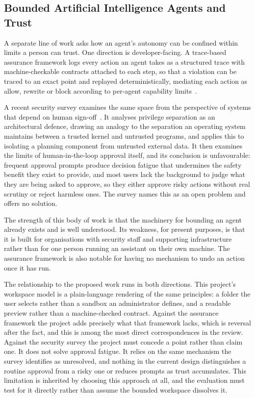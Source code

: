 \documentclass{FastFyp}
\begin{document}
\subsection{Bounded Artificial Intelligence Agents and Trust}
A separate line of work asks how an agent's autonomy can be confined within limits a person can trust. One direction is developer-facing. A trace-based assurance framework logs every action an agent takes as a structured trace with machine-checkable contracts attached to each step, so that a violation can be traced to an exact point and replayed deterministically, mediating each action as allow, rewrite or block according to per-agent capability limits~\cite{ref:paduraru2026}.

A recent security survey examines the same space from the perspective of systems that depend on human sign-off~\cite{ref:kim2026}. It analyses privilege separation as an architectural defence, drawing an analogy to the separation an operating system maintains between a trusted kernel and untrusted programs, and applies this to isolating a planning component from untrusted external data. It then examines the limits of human-in-the-loop approval itself, and its conclusion is unfavourable: frequent approval prompts produce decision fatigue that undermines the safety benefit they exist to provide, and most users lack the background to judge what they are being asked to approve, so they either approve risky actions without real scrutiny or reject harmless ones. The survey names this as an open problem and offers no solution.

The strength of this body of work is that the machinery for bounding an agent already exists and is well understood. Its weakness, for present purposes, is that it is built for organisations with security staff and supporting infrastructure rather than for one person running an assistant on their own machine. The assurance framework is also notable for having no mechanism to undo an action once it has run.

The relationship to the proposed work runs in both directions. This project's workspace model is a plain-language rendering of the same principles: a folder the user selects rather than a sandbox an administrator defines, and a readable preview rather than a machine-checked contract. Against the assurance framework the project adds precisely what that framework lacks, which is reversal after the fact, and this is among the most direct correspondences in the review. Against the security survey the project must concede a point rather than claim one. It does not solve approval fatigue. It relies on the same mechanism the survey identifies as unresolved, and nothing in the current design distinguishes a routine approval from a risky one or reduces prompts as trust accumulates. This limitation is inherited by choosing this approach at all, and the evaluation must test for it directly rather than assume the bounded workspace dissolves it.
\end{document}

